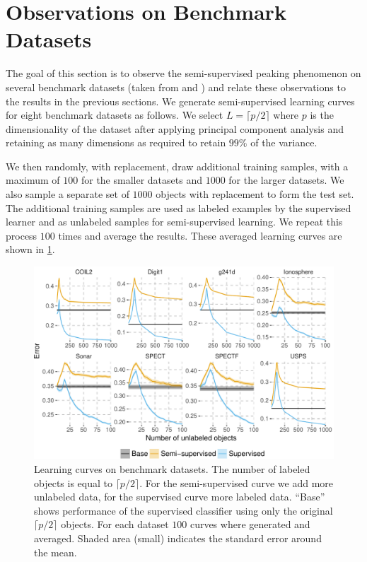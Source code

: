 \documentclass[runningheads,a4paper]{llncs}\usepackage[]{graphicx}\usepackage[]{color}
\makeatletter
\def\maxwidth{ %
  \ifdim\Gin@nat@width>\linewidth
    \linewidth
  \else
    \Gin@nat@width
  \fi
}
\newenvironment{knitrout}{}{} %
\makeatother
\begin{document}
\section{Observations on Benchmark Datasets}
The goal of this section is to observe the semi-supervised peaking phenomenon on several benchmark datasets (taken from \cite{Chapelle2006} and \cite{Lichman2013}) and relate these observations to the results in the previous sections. We generate semi-supervised learning curves for eight benchmark datasets as follows. We select $L=\lceil p/2 \rceil$ where $p$ is the dimensionality of the dataset after applying principal component analysis and retaining as many dimensions as required to retain $99\%$ of the variance. 

We then randomly, with replacement, draw additional training samples, with a maximum of $100$ for the smaller datasets and $1000$ for the larger datasets. We also sample a separate set of $1000$ objects with replacement to form the test set. The additional training samples are used as labeled examples by the supervised learner and as unlabeled samples for semi-supervised learning. We repeat this process $100$ times and average the results. These averaged learning curves are shown in \cref{fig:benchmark}.

\begin{knitrout}
\color{fgcolor}\begin{figure}
\includegraphics[width=\maxwidth]{figure/benchmark-1} \caption[Learning curves on benchmark datasets]{Learning curves on benchmark datasets. The number of labeled objects is equal to $\lceil p/2 \rceil$. For the semi-supervised curve we add more unlabeled data, for the supervised curve more labeled data. ``Base'' shows performance of the supervised classifier using only the original $\lceil p/2 \rceil$ objects. For each dataset $100$ curves where generated and averaged. Shaded area (small) indicates the standard error around the mean.}\label{fig:benchmark}
\end{figure}


\end{knitrout}
\end{document}
